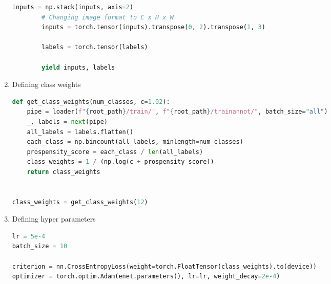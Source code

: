 \begin{enumerate}
\begin{lstlisting}[language=Python]
        inputs = np.stack(inputs, axis=2)
        # Changing image format to C x H x W
        inputs = torch.tensor(inputs).transpose(0, 2).transpose(1, 3)

        labels = torch.tensor(labels)

        yield inputs, labels
\end{lstlisting}
    \item Defining class weights
          \begin{lstlisting}[language=Python]
def get_class_weights(num_classes, c=1.02):
    pipe = loader(f"{root_path}/train/", f"{root_path}/trainannot/", batch_size="all")
    _, labels = next(pipe)
    all_labels = labels.flatten()
    each_class = np.bincount(all_labels, minlength=num_classes)
    prospensity_score = each_class / len(all_labels)
    class_weights = 1 / (np.log(c + prospensity_score))
    return class_weights


class_weights = get_class_weights(12)
\end{lstlisting}
    \item Defining hyper parameters
          \begin{lstlisting}[language=Python]
lr = 5e-4
batch_size = 10

criterion = nn.CrossEntropyLoss(weight=torch.FloatTensor(class_weights).to(device))
optimizer = torch.optim.Adam(enet.parameters(), lr=lr, weight_decay=2e-4)


\end{lstlisting}
\end{enumerate}
